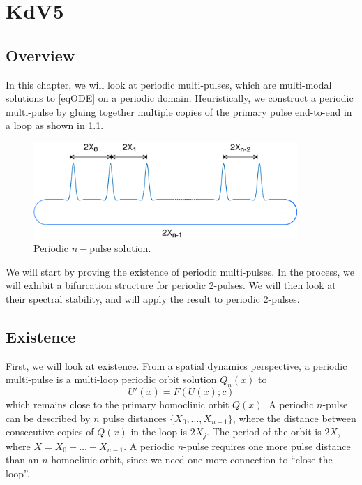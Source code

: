 \documentclass[thesis.tex]{subfiles}
\begin{document}
\iffulldocument\else
	\chapter{KdV5}
\fi

\section{Overview}

In this chapter, we will look at periodic multi-pulses, which are multi-modal solutions to \cref{eqODE} on a periodic domain. Heuristically, we construct a periodic multi-pulse by gluing together multiple copies of the primary pulse end-to-end in a loop as shown in \cref{fig:permultipulse}.
\begin{figure}
\includegraphics[width=10cm]{periodic/multipulseperiodic}
\caption{Periodic $n-$pulse solution.}
\label{fig:permultipulse}
\end{figure}

We will start by proving the existence of periodic multi-pulses. In the process, we will exhibit a bifurcation structure for periodic 2-pulses. We will then look at their spectral stability, and will apply the result to periodic 2-pulses.

\section{Existence}\label{sec:perexist}

First, we will look at existence. From a spatial dynamics perspective, a periodic multi-pulse is a multi-loop periodic orbit solution $Q_n(x)$ to
\begin{equation}\label{existgenODE}
U'(x) = F(U(x); c)
\end{equation}
which remains close to the primary homoclinic orbit $Q(x)$. A periodic $n$-pulse can be described by $n$ pulse distances $\{X_0, \dots, X_{n-1} \}$, where the distance between consecutive copies of $Q(x)$ in the loop is $2 X_j$. The period of the orbit is $2X$, where $X = X_0 + \dots + X_{n-1}$. A periodic $n$-pulse requires one more pulse distance than an $n$-homoclinic orbit, since we need one more connection to ``close the loop''.  
\end{document}

